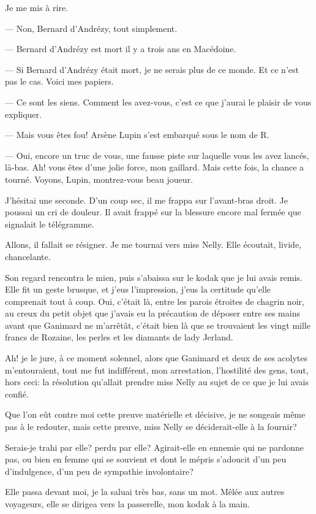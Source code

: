 \documentclass[12pt,a4paper]{book}
\begin{document}
Je me mis à rire.

— Non, Bernard d’Andrézy, tout simplement.

— Bernard d’Andrézy est mort il y a trois ans en Macédoine.

— Si Bernard d’Andrézy était mort, je ne serais plus de ce monde. Et ce n’est pas le cas. Voici mes papiers.

— Ce sont les siens. Comment les avez-vous, c’est ce que j’aurai le plaisir de vous expliquer.

— Mais vous êtes fou! Arsène Lupin s’est embarqué sous le nom de R. 

— Oui, encore un truc de vous, une fausse piste sur laquelle vous les avez lancés, là-bas. Ah! vous êtes d’une jolie force, mon gaillard. Mais cette fois, la chance a tourné. Voyons, Lupin, montrez-vous beau joueur.

J’hésitai une seconde. D’un coup sec, il me frappa sur l’avant-bras droit. Je poussai un cri de douleur. Il avait frappé sur la blessure encore mal fermée que signalait le télégramme.

Allons, il fallait se résigner. Je me tournai vers miss Nelly. Elle écoutait, livide, chancelante.

Son regard rencontra le mien, puis s’abaissa sur le kodak que je lui avais remis. Elle fit un geste brusque, et j’eus l’impression, j’eus la certitude qu’elle comprenait tout à coup. Oui, c’était là, entre les parois étroites de chagrin noir, au creux du petit objet que j’avais eu la précaution de déposer entre ses mains avant que Ganimard ne m’arrêtât, c’était bien là que se trouvaient les vingt mille francs de Rozaine, les perles et les diamants de lady Jerland.

Ah! je le jure, à ce moment solennel, alors que Ganimard et deux de ses acolytes m’entouraient, tout me fut indifférent, mon arrestation, l’hostilité des gens, tout, hors ceci: la résolution qu’allait prendre miss Nelly au sujet de ce que je lui avais confié.

Que l’on eût contre moi cette preuve matérielle et décisive, je ne songeais même pas à le redouter, mais cette preuve, miss Nelly se déciderait-elle à la fournir?

Serais-je trahi par elle? perdu par elle? Agirait-elle en ennemie qui ne pardonne pas, ou bien en femme qui se souvient et dont le mépris s’adoucit d’un peu d’indulgence, d’un peu de sympathie involontaire?

Elle passa devant moi, je la saluai très bas, sans un mot. Mêlée aux autres voyageurs, elle se dirigea vers la passerelle, mon kodak à la main.
\end{document}
